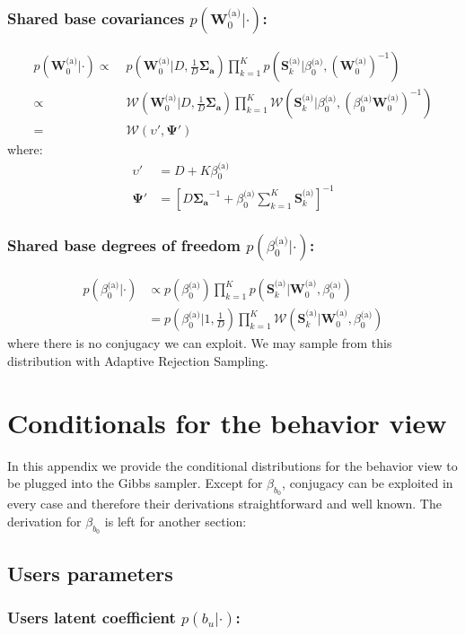 \documentclass[smallextended]{svjour3}          %
\newcommand{\Wo}{\mathbf{W}_{0}^\text{(a)}}
\newcommand{\invWo}{\left(\mathbf{W}_{0}^{\text{(a)}}\right)^{-1}}
\newcommand{\betaoa}{\beta_{0}^\text{(a)}}
\newcommand{\Sk}{\mathbf{S}_{k}^\text{(a)}}
\begin{document}
\subsubsection*{Shared base covariances $p(\Wo | \cdot)$:}
\begin{align*}
p(\Wo | \cdot) 
\propto\;&
p\left(\Wo  | D, \frac{1}{D} \boldsymbol{\Sigma_a}\right) 
\prod_{k=1}^K p\left(\Sk | \betaoa, \invWo\right)\\
\propto\;&
\mathcal{W}\left(\Wo | D, \frac{1}{D} \boldsymbol{\Sigma_a}\right)
\prod_{k=1}^K \mathcal{W}\left(\Sk | \betaoa, \left(\betaoa\Wo\right)^{-1}\right)\\
=\;&
\mathcal{W}(\upsilon', \boldsymbol{\Psi}')
\end{align*}
where:
\begin{align*} 
\upsilon' &=D + K\betaoa\\
\boldsymbol{\Psi}' &=
\left[D\boldsymbol{\Sigma_a}^{-1} +  \betaoa\sum_{k=1}^K\Sk\right]^{-1}
\end{align*}

\subsubsection*{Shared base degrees of freedom $p(\betaoa | \cdot)$:}
\begin{align*}
p(\betaoa | \cdot) 
&\propto 
p(\betaoa) \prod_{k=1}^K p\left(\Sk | \Wo ,  \betaoa\right)\\
&=p(\betaoa | 1, \frac{1}{D})\prod_{k=1}^K  \mathcal{W} \left(\Sk | \Wo ,  \betaoa\right)
\end{align*}
where there is no conjugacy we can exploit. We may sample from this distribution with Adaptive Rejection Sampling.

\section{Conditionals for the behavior view}
In this appendix we provide the conditional distributions for the behavior view to be plugged into the Gibbs sampler. Except for $\beta_{b_0}$, conjugacy can be exploited in every case and therefore their derivations straightforward and well known. The derivation for $\beta_{b_0}$ is left for another section:
\subsection{Users parameters}
\subsubsection*{Users latent coefficient $p(b_u | \cdot )$:}
\end{document}
